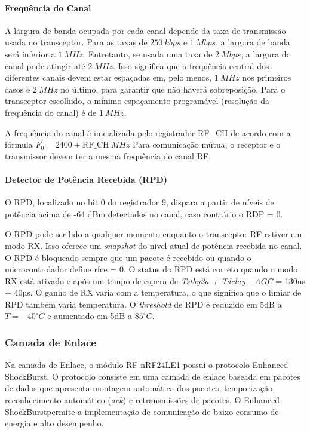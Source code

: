 \paragraph*{Frequência do Canal}
A largura de banda ocupada por cada canal depende da taxa de transmissão usada no transceptor. Para as taxas de $250~kbps$ e $1~Mbps$, a largura de banda será inferior a $1~MHz$. Entretanto, se usada uma taxa de $2~Mbps$, a largura do canal pode atingir até $2~MHz$. Isso significa que a frequência central dos diferentes canais devem estar espaçadas em, pelo menos, $1~MHz$ nos primeiros casos e $2~MHz$ no último, para garantir que não haverá sobreposição. Para o transceptor escolhido, o mínimo espaçamento programável (resolução da frequência do canal) é de $1~MHz$.


A frequência do canal é inicializada pelo registrador RF\_{CH} de acordo com a fórmula 
$F_0= 2400 + \text{RF\_{CH}}~MHz$
Para comunicação mútua, o receptor e o transmissor devem ter a mesma frequência do canal RF.

\paragraph*{Detector de Potência Recebida (RPD)}

O RPD, localizado no bit 0 do registrador 9, dispara a partir de níveis de potência acima de -64 dBm detectados no canal, caso contrário o RDP = 0.

O RPD pode ser lido a qualquer momento enquanto o transceptor RF estiver em modo RX. Isso oferece um \emph{snapshot} do nível atual de potência recebida no canal. O RPD é bloqueado sempre que um pacote é recebido ou 
quando o microcontrolador define rfce = 0. O status do RPD está correto quando o modo RX está ativado e após um tempo de espera de \emph{Tstby2a + Tdelay\_ AGC} = 130us + 40µs. O ganho de RX varia com a temperatura, o que significa que o limiar de RPD também varia temperatura. O \emph{threshold} de RPD é reduzido em 5dB a $T = -40^{\circ}C$ e aumentado em 5dB a $85 ^{\circ}C$.

\subsubsection{Camada de Enlace}

Na camada de Enlace, o módulo RF nRF24LE1 possui o protocolo Enhanced ShockBurst\texttrademark. O protocolo consiste em uma camada de enlace baseada em pacotes de dados que apresenta montagem automática dos pacotes,
temporização, reconhecimento automático (\emph{ack}) e retransmissões de pacotes. O Enhanced ShockBurst\texttrademark permite a implementação de comunicação de baixo consumo de energia e alto desempenho.

